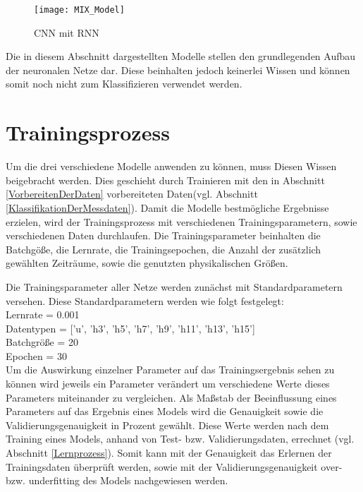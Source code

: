     \begin{figure}[H]
        \centering
        \texttt{[image: MIX\_Model]}
        \caption{\ac{CNN} mit \ac{RNN} \protect\cite{Tensorboard}}
        \label{fig:MIX_MODEL}
    \end{figure}

    Die in diesem Abschnitt dargestellten Modelle stellen den grundlegenden Aufbau der neuronalen Netze dar.
    Diese beinhalten jedoch keinerlei Wissen und können somit noch nicht zum Klassifizieren verwendet werden.    


\section{Trainingsprozess}
    Um die drei verschiedene Modelle anwenden zu können, muss Diesen Wissen beigebracht werden.
    Dies geschieht durch Trainieren mit den in Abschnitt \ref{VorbereitenDerDaten} vorbereiteten Daten(vgl. Abschnitt \ref{KlassifikationDerMessdaten}).
    Damit die Modelle bestmögliche Ergebnisse erzielen, wird der Trainingsprozess mit verschiedenen Trainingsparametern, sowie verschiedenen Daten durchlaufen.
    Die Trainingsparameter beinhalten die Batchgöße, die Lernrate, die Trainingsepochen, die Anzahl der zusätzlich gewählten Zeiträume, sowie die genutzten physikalischen Größen.
    \newline

    \noindent
    Die Trainingsparameter aller Netze werden zunächst mit Standardparametern versehen.
    \newline
    \noindent
    Diese Standardparametern werden wie folgt festgelegt:\\
    \noindent
    Lernrate = 0.001\\
    \noindent
    Datentypen = ['u', 'h3', 'h5', 'h7', 'h9', 'h11', 'h13', 'h15']\\
    \noindent
    Batchgröße = 20\\
    \noindent
    Epochen = 30\\

    \noindent
    Um die Auswirkung einzelner Parameter auf das Trainingsergebnis sehen zu können wird jeweils ein Parameter verändert um verschiedene Werte dieses Parameters miteinander zu vergleichen.
    \newline
    \noindent
    Als Maßstab der Beeinflussung eines Parameters auf das Ergebnis eines Models wird die Genauigkeit sowie die Validierungsgenauigkeit in Prozent gewählt.
    Diese Werte werden nach dem Training eines Models, anhand von Test- bzw. Validierungsdaten, errechnet (vgl. Abschnitt \ref{Lernprozess}). 
    Somit kann mit der Genauigkeit das Erlernen der Trainingsdaten überprüft werden, sowie mit der Validierungsgenauigkeit over- bzw. underfitting des Models nachgewiesen werden.
    \newline


